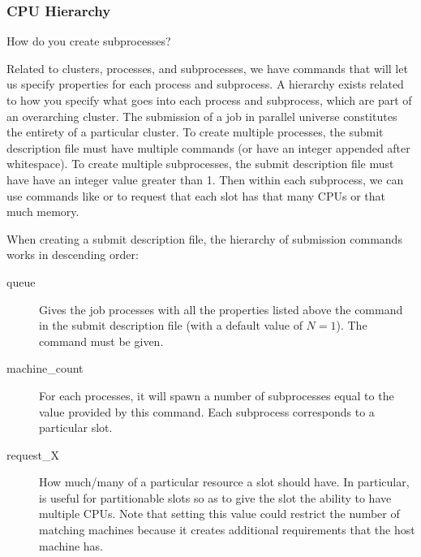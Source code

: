 \subsubsection{CPU Hierarchy}


How do you create subprocesses?

Related to clusters, processes, and subprocesses, we have commands that will 
let us specify properties for each process and subprocess. A hierarchy exists 
related to how you specify what goes into each process and subprocess, which are
part of an overarching cluster. The submission of a job in parallel universe 
constitutes the entirety of a particular cluster. To create multiple processes,
the submit description file must have multiple  commands (or have
an integer appended after whitespace). To create multiple subprocesses, the 
submit description file must have  have an integer
value greater than 1. Then within each subprocess, we can use commands like
 or  to request that each 
slot has that many CPUs or that much memory.

When creating a submit description file, the hierarchy of submission commands
works in descending order:
\begin{description}
\item[queue ] Gives the job  processes with all the properties
listed above the  command in the submit description file (with 
a default value of $N=1$). The command  must be given.
\item[machine\_count] For each processes, it will spawn a number of subprocesses
equal to the value provided by this command. Each subprocess corresponds to a
particular slot.
\item[request\_X] How much/many of a particular resource a slot should have. In 
particular,  is useful for partitionable slots so as to
give the slot the ability to have multiple CPUs. Note that setting this value 
could restrict the number of matching machines because it creates additional
requirements that the host machine has.
\end{description}

